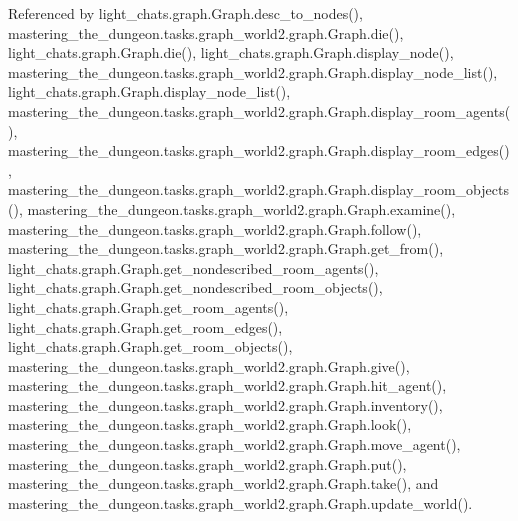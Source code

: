Referenced by light\+\_\+chats.\+graph.\+Graph.\+desc\+\_\+to\+\_\+nodes(), mastering\+\_\+the\+\_\+dungeon.\+tasks.\+graph\+\_\+world2.\+graph.\+Graph.\+die(), light\+\_\+chats.\+graph.\+Graph.\+die(), light\+\_\+chats.\+graph.\+Graph.\+display\+\_\+node(), mastering\+\_\+the\+\_\+dungeon.\+tasks.\+graph\+\_\+world2.\+graph.\+Graph.\+display\+\_\+node\+\_\+list(), light\+\_\+chats.\+graph.\+Graph.\+display\+\_\+node\+\_\+list(), mastering\+\_\+the\+\_\+dungeon.\+tasks.\+graph\+\_\+world2.\+graph.\+Graph.\+display\+\_\+room\+\_\+agents(), mastering\+\_\+the\+\_\+dungeon.\+tasks.\+graph\+\_\+world2.\+graph.\+Graph.\+display\+\_\+room\+\_\+edges(), mastering\+\_\+the\+\_\+dungeon.\+tasks.\+graph\+\_\+world2.\+graph.\+Graph.\+display\+\_\+room\+\_\+objects(), mastering\+\_\+the\+\_\+dungeon.\+tasks.\+graph\+\_\+world2.\+graph.\+Graph.\+examine(), mastering\+\_\+the\+\_\+dungeon.\+tasks.\+graph\+\_\+world2.\+graph.\+Graph.\+follow(), mastering\+\_\+the\+\_\+dungeon.\+tasks.\+graph\+\_\+world2.\+graph.\+Graph.\+get\+\_\+from(), light\+\_\+chats.\+graph.\+Graph.\+get\+\_\+nondescribed\+\_\+room\+\_\+agents(), light\+\_\+chats.\+graph.\+Graph.\+get\+\_\+nondescribed\+\_\+room\+\_\+objects(), light\+\_\+chats.\+graph.\+Graph.\+get\+\_\+room\+\_\+agents(), light\+\_\+chats.\+graph.\+Graph.\+get\+\_\+room\+\_\+edges(), light\+\_\+chats.\+graph.\+Graph.\+get\+\_\+room\+\_\+objects(), mastering\+\_\+the\+\_\+dungeon.\+tasks.\+graph\+\_\+world2.\+graph.\+Graph.\+give(), mastering\+\_\+the\+\_\+dungeon.\+tasks.\+graph\+\_\+world2.\+graph.\+Graph.\+hit\+\_\+agent(), mastering\+\_\+the\+\_\+dungeon.\+tasks.\+graph\+\_\+world2.\+graph.\+Graph.\+inventory(), mastering\+\_\+the\+\_\+dungeon.\+tasks.\+graph\+\_\+world2.\+graph.\+Graph.\+look(), mastering\+\_\+the\+\_\+dungeon.\+tasks.\+graph\+\_\+world2.\+graph.\+Graph.\+move\+\_\+agent(), mastering\+\_\+the\+\_\+dungeon.\+tasks.\+graph\+\_\+world2.\+graph.\+Graph.\+put(), mastering\+\_\+the\+\_\+dungeon.\+tasks.\+graph\+\_\+world2.\+graph.\+Graph.\+take(), and mastering\+\_\+the\+\_\+dungeon.\+tasks.\+graph\+\_\+world2.\+graph.\+Graph.\+update\+\_\+world().

